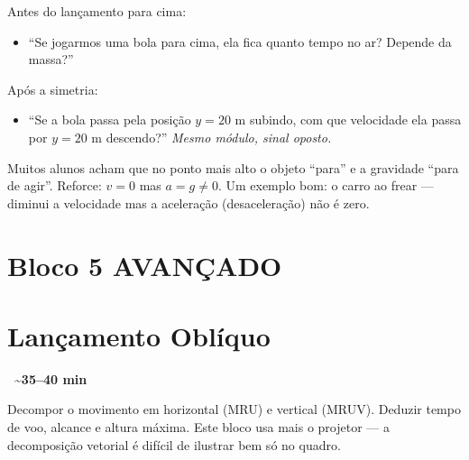 \documentclass[12pt,a4paper]{article}
\newcommand{\tempo}[1]{%
  \begin{flushright}
    \colorbox{azulphysics!20}{\small\textbf{\faClock\ \textasciitilde{}#1 min}}
  \end{flushright}\vspace{-0.5em}
}
\begin{document}
\begin{tcolorbox}[perguntabox]
  Antes do lan\c{c}amento para cima:
  \begin{itemize}[nosep]
    \item ``Se jogarmos uma bola para cima, ela fica quanto tempo no ar?
          Depende da massa?''
  \end{itemize}
  Ap\'os a simetria:
  \begin{itemize}[nosep]
    \item ``Se a bola passa pela posi\c{c}\~ao $y = 20$ m subindo, com
          que velocidade ela passa por $y = 20$ m descendo?''
          \textit{Mesmo m\'odulo, sinal oposto.}
  \end{itemize}
\end{tcolorbox}

\begin{tcolorbox}[dicabox]
  Muitos alunos acham que no ponto mais alto o objeto ``para'' e a
  gravidade ``para de agir''. Reforce: $v = 0$ mas $a = g \neq 0$.
  Um exemplo bom: o carro ao frear --- diminui a velocidade mas a
  acelera\c{c}\~ao (desacelera\c{c}\~ao) n\~ao \'e zero.
\end{tcolorbox}

\newpage

\section*{Bloco 5 \hfill\colorbox{laranjaalerta!40}{\small AVAN\c{C}ADO}}
\section*{\hspace{1.2em}Lan\c{c}amento Obl\'iquo}
\tempo{35--40}

\begin{tcolorbox}[blocobox={Objetivos}]
  Decompor o movimento em horizontal (MRU) e vertical (MRUV).
  Deduzir tempo de voo, alcance e altura m\'axima.
  Este bloco usa mais o projetor --- a decomposi\c{c}\~ao vetorial
  \'e dif\'icil de ilustrar bem s\'o no quadro.
\end{tcolorbox}
\end{document}
